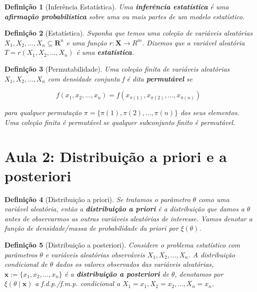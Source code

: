 \documentclass{article}
\newtheorem{definition}{Definição}
\begin{document}
\begin{definition}[Inferência Estatística]
Uma \textbf{inferência estatística} é uma \textbf{afirmação probabilística} sobre uma ou mais partes de um modelo estatístico.
\end{definition}

\begin{definition}[Estatística]
Suponha que temos uma coleção de variáveis aleatórias $X_1, X_2, \ldots, X_n \subseteq \mathbf{R}^n$ e uma função $r: \mathbf{X} \rightarrow R^m$. Dizemos que a variável aleatória $T = r(X_1, X_2, \ldots, X_n)$ é uma \textbf{estatística}.
\end{definition}

\begin{definition}[Permutabilidade]
Uma coleção finita de variáveis aleatórias $X_1, X_2, \ldots, X_n$ com densidade conjunta f é dita \textbf{permutável} se

\begin{equation}
f(x_1, x_2, \ldots, x_n) = f(x_{\pi(1)}, x_{\pi(2)}, \ldots, x_{\pi(n)})
\end{equation}

para qualquer permutação $\pi = \{\pi(1), \pi(2), \ldots, \pi(n)\}$ dos seus elementos. Uma coleção finita é permutável se qualquer subconjunto finito é permutável.
\end{definition}

\section*{Aula 2:  Distribuição a priori e a posteriori}
\label{s2}
\begin{definition}[Distribuição a priori]
Se tratamos o parâmetro $\theta$ como uma variável aleatória, então a \textbf{distribuição a priori} é a distribuição que damos a $\theta$ antes de observarmos as outras variáveis aleatórias de interesse. Vamos denotar a função de densidade/massa de probabilidade da priori por $\xi(\theta)$.
\end{definition}

\begin{definition}[Distribuição a posteriori]
Considere o problema estatístico com parâmetros $\theta$ e variáveis aleatórias observáveis $X_1, X_2, \ldots, X_n$. A distribuição condicional de $\theta$ dados os valores observados das variáveis aleatórias, $\textbf{x} := \{x_1, x_2, \ldots, x_n\}$ é a \textbf{distribuição a posteriori} de $\theta$, denotamos por $\xi(\theta \mid \textbf{x})$ a f.d.p./f.m.p. condicional a $X_1 = x_1, X_2 = x_2, \ldots, X_n = x_n$.
\end{definition}
\end{document}
